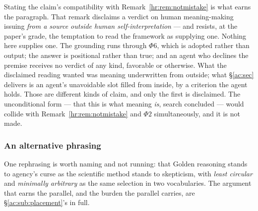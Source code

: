 \documentclass[11pt]{article}
\numberwithin{equation}{section}
\theoremstyle{plain}
\theoremstyle{definition}
\theoremstyle{remark}
\begin{document}
Stating the claim's compatibility with Remark~\ref{hr:rem:notmistake} is what earns the paragraph. That remark disclaims a verdict on human meaning-making issuing \emph{from a source outside human self-interpretation} --- and resists, at the paper's grade, the temptation to read the framework as supplying one. Nothing here supplies one. The grounding runs through $\Phi6$, which is adopted rather than output; the answer is positional rather than true; and an agent who declines the premise receives no verdict of any kind, favorable or otherwise. What the disclaimed reading wanted was meaning underwritten from outside; what \S\ref{ac:sec} delivers is an agent's unavoidable slot filled from inside, by a criterion the agent holds. Those are different kinds of claim, and only the first is disclaimed. The unconditional form --- that this is what meaning \emph{is}, search concluded --- would collide with Remark~\ref{hr:rem:notmistake} and $\Phi2$ simultaneously, and it is not made.

\subsubsection{An alternative phrasing}\label{ac:ssub:phrasing}

One rephrasing is worth naming and not running: that Golden reasoning stands to agency's curse as the scientific method stands to skepticism, with \emph{least circular} and \emph{minimally arbitrary} as the same selection in two vocabularies. The argument that earns the parallel, and the burden the parallel carries, are \S\ref{ac:sub:placement}'s in full.

%
%
\end{document}
